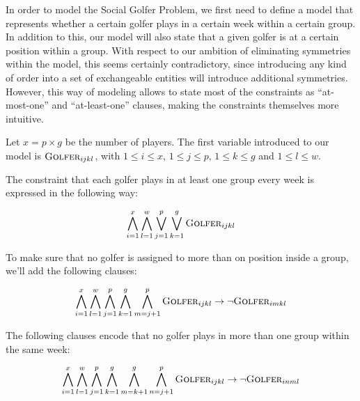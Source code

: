 \documentclass[a4paper]{scrartcl}
\begin{document}
In order to model the Social Golfer Problem, we first need to define a model that represents whether a certain golfer plays in a certain week within a certain group. In addition to this, our model will also state that a given golfer is at a certain position within a group. With respect to our ambition of eliminating symmetries within the model, this seems certainly contradictory, since introducing any kind of order into a set of exchangeable entities will introduce additional symmetries. However, this way of modeling allows to state most of the constraints as ``at-most-one'' and ``at-least-one'' clauses, making the constraints themselves more intuitive.

Let $x = p \times g$ be the number of players. The first variable introduced to our model is $\textsc{Golfer}_{ijkl}$, with $1 \leq i \leq x$, $1 \leq j \leq p$, $1 \leq k \leq g$ and $1 \leq l \leq w$.

The constraint that each golfer plays in at least one group every week is expressed in the following way:

\begin{equation}
\label{form:everyone_plays}
\centering
    \bigwedge \limits_{i=1}^x 
    \bigwedge \limits_{l=1}^w 
    \bigvee \limits_{j=1}^p
    \bigvee \limits_{k=1}^g 
    \textsc{Golfer}_{ijkl}
\end{equation}

To make sure that no golfer is assigned to more than on position inside a group, we'll add the following clauses:

\begin{equation}
\centering
    \bigwedge \limits_{i=1}^x 
    \bigwedge \limits_{l=1}^w 
    \bigwedge \limits_{j=1}^p
    \bigwedge \limits_{k=1}^g 
    \bigwedge \limits_{m=j+1}^p 
    \textsc{Golfer}_{ijkl} 
    \to
    \neg \textsc{Golfer}_{imkl}
\end{equation}

The following clauses encode that no golfer plays in more than one group within the same week:

\begin{equation}
\centering
    \bigwedge \limits_{i=1}^x 
    \bigwedge \limits_{l=1}^w 
    \bigwedge \limits_{j=1}^p
    \bigwedge \limits_{k=1}^g 
    \bigwedge \limits_{m=k+1}^g 
    \bigwedge \limits_{n=j+1}^p 
    \textsc{Golfer}_{ijkl} 
    \to
    \neg \textsc{Golfer}_{inml}
\end{equation}
\end{document}
